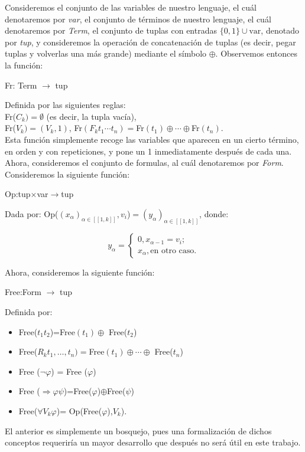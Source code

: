 \begin{obs}
Consideremos el conjunto de las variables de nuestro lenguaje, el cuál denotaremos por \textit{var}, el conjunto de términos de nuestro lenguaje, el cuál denotaremos por \textit{Term}, el conjunto de tuplas con entradas $\{0,1\}\cup\text{var}$, denotado por \textit{tup}, y consideremos la operación de concatenación de tuplas (es decir, pegar tuplas y volverlas una más grande) mediante el símbolo $\oplus$. Observemos entonces la función:

\begin{center}
         Fr: Term $\longrightarrow$ tup\\ 
\end{center}
Definida por las siguientes reglas:\\
   Fr($C_k)=\emptyset$ (es decir, la tupla vacía),\\
   Fr($V_k)=(V_k,1)$, \hspace{5mm} Fr$(F_k t_1 \cdots t_n)=$Fr$(t_1) \oplus\cdots\oplus $Fr$(t_n)$. \\

Esta función simplemente recoge las variables que aparecen en un cierto término, en orden y con repeticiones, y pone un 1 inmediatamente después de cada una. Ahora, consideremos el conjunto de formulas, al cuál denotaremos por \textit{Form}. Consideremos la siguiente función:

\begin{center}
        Op:tup$\times$var$\longrightarrow$tup
\end{center}
Dada por:
    Op(${(x_\alpha)}_{\alpha\in[[1,k]]},v_i$)$={(y_\alpha)}_{\alpha\in[[1,k]]}$, donde:

\[y_\alpha=\begin{cases}
    0, x_{\alpha-1}=v_i;\\
    x_\alpha, \text{en otro caso}.
\end{cases}\]

Ahora, consideremos la siguiente función:

\begin{center}
         Free:Form $\longrightarrow$ tup \\
\end{center}
Definida por:
   \begin{itemize}
       \item  Free($t_1t_2$)=Free$(t_1) \oplus $ Free($t_2$)
       \item  Free($R_kt_1,\ldots,t_n)=$Free$(t_1) \oplus\cdots\oplus$ Free($t_n$)
       \item  Free ($\neg \varphi$) = Free ($\varphi$)
       \item  Free ($\Rightarrow \varphi \psi$)=Free($\varphi$)$\oplus$Free($\psi$)
       \item  Free($\forall V_k \varphi$)= Op(Free($\varphi$),$V_k$).
   \end{itemize}
\end{obs}
El anterior es simplemente un bosquejo, pues una formalización de dichos conceptos requeriría un mayor desarrollo que después no será útil en este trabajo.

